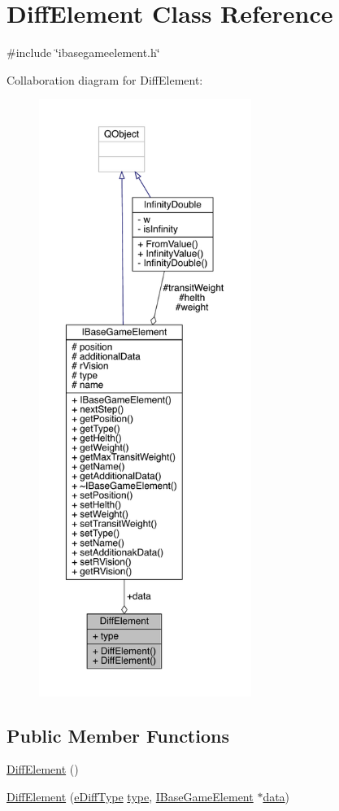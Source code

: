 \hypertarget{a00141}{}\section{Diff\+Element Class Reference}
\label{a00141}


{\ttfamily \#include \char`\"{}ibasegameelement.\+h\char`\"{}}



Collaboration diagram for Diff\+Element\+:
\nopagebreak
\begin{figure}[H]
\begin{center}
\leavevmode
\includegraphics[height=550pt]{de/d14/a00139}
\end{center}
\end{figure}
\subsection*{Public Member Functions}
\begin{DoxyCompactItemize}
\item 
\hyperlink{a00141_abb725fa0a448bf536959a5c469556599}{Diff\+Element} ()
\item 
\hyperlink{a00141_a82e8ecd785a9d06708c42f128b7aaf09}{Diff\+Element} (\hyperlink{a00047_ab32e61d383765a32bc5f9efebb4b9f55}{e\+Diff\+Type} \hyperlink{a00141_ad5d4aeee742d315da4f48e7f0b0218db}{type}, \hyperlink{a00137}{I\+Base\+Game\+Element} $\ast$\hyperlink{a00141_a656245277c76d03d7c20a55c54db6fef}{data})
\end{DoxyCompactItemize}
